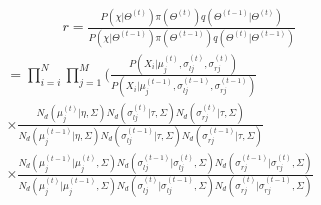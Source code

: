 \documentclass[conference]{llncs}
\begin{document}
\begin{multline}
\qquad\qquad r = \frac{P(\chi|\Theta^{(t)})\pi(\Theta^{(t)})q(\Theta^{(t-1)}|\Theta^{(t)})}{P(\chi|\Theta^{(t-1)})\pi(\Theta^{(t-1)})q(\Theta^{(t)}|\Theta^{(t-1)})} \\
= \prod_{i=i}^N \prod_{j=1}^M(\frac{P(X_i|\mu_j^{(t)},\sigma_{lj}^{(t)},\sigma_{rj}^{(t)})}
{P(X_i|\mu_j^{(t-1)},\sigma_{lj}^{(t-1)},\sigma_{rj}^{(t-1)})} \qquad\qquad\\
\times \frac{\textit{N}_d(\mu_j^{(t)}|\eta,\Sigma)\textit{N}_d(\sigma_{lj}^{(t)}|\tau,\Sigma)\textit{N}_d(\sigma_{rj}^{(t)}|\tau,\Sigma)}{\textit{N}_d(\mu_j^{(t-1)}|\eta,\Sigma)\textit{N}_d(\sigma_{lj}^{(t-1)}|\tau,\Sigma)\textit{N}_d(\sigma_{rj}^{(t-1)}|\tau,\Sigma)} \\
\times \frac{\textit{N}_d(\mu_j^{(t-1)}|\mu_j^{(t)},\Sigma)\textit{N}_d(\sigma_{lj}^{(t-1)}|\sigma_{lj}^{(t)},\Sigma)\textit{N}_d(\sigma_{rj}^{(t-1)}|\sigma_{rj}^{(t)},\Sigma)}{\textit{N}_d(\mu_j^{(t)}|\mu_j^{(t-1)},\Sigma)\textit{N}_d(\sigma_{lj}^{(t)}|\sigma_{lj}^{(t-1)},\Sigma)\textit{N}_d(\sigma_{rj}^{(t)}|\sigma_{rj}^{(t-1)},\Sigma)}
\label{eq:15}
\end{multline}
\end{document}
